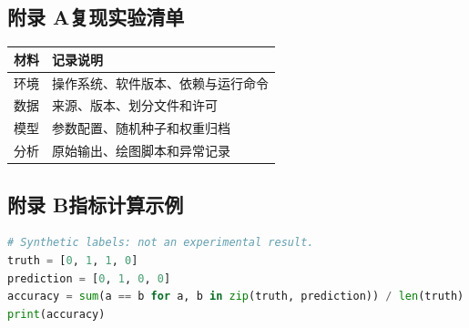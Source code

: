 \subsection*{附录 A\quad 复现实验清单}
\begin{longtable}{lp{.68\linewidth}}\toprule 材料 & 记录说明\\\midrule\endhead
环境 & 操作系统、软件版本、依赖与运行命令\\
数据 & 来源、版本、划分文件和许可\\
模型 & 参数配置、随机种子和权重归档\\
分析 & 原始输出、绘图脚本和异常记录\\\bottomrule\end{longtable}
\subsection*{附录 B\quad 指标计算示例}
\begin{lstlisting}[language=Python]
# Synthetic labels: not an experimental result.
truth = [0, 1, 1, 0]
prediction = [0, 1, 0, 0]
accuracy = sum(a == b for a, b in zip(truth, prediction)) / len(truth)
print(accuracy)
\end{lstlisting}
